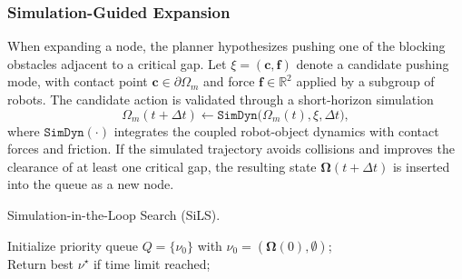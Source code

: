 \subsubsection{Simulation-Guided Expansion}
\label{subsubsec:simloop-expansion}
When expanding a node, the planner hypothesizes pushing one of the blocking
obstacles adjacent to a critical gap. Let $\xi=(\mathbf{c},\mathbf{f})$
denote a candidate pushing mode, with contact point $\mathbf{c}\in\partial\Omega_m$
and force $\mathbf{f}\in\mathbb{R}^2$ applied by a subgroup of robots. The
candidate action is validated through a short-horizon simulation
\begin{equation}\label{eq:simloop-dynamics}
  \Omega_m(t+\Delta t) \leftarrow
  \texttt{SimDyn}\big(\Omega_m(t),\xi,\Delta t\big),
\end{equation}
where $\texttt{SimDyn}(\cdot)$ integrates the coupled robot-object dynamics
with contact forces and friction. If the simulated trajectory avoids
collisions and improves the clearance of at least one critical gap, the
resulting state $\boldsymbol{\Omega}(t+\Delta t)$ is inserted into the queue
as a new node.

\begin{algorithm}[t]
  \caption{Simulation-in-the-Loop Search (SiLS).}
  \label{alg:SiLS}
  \SetAlgoLined
  Initialize priority queue $Q=\{\nu_0\}$ with $\nu_0=(\boldsymbol{\Omega}(0),\emptyset)$;\\
  Return best $\nu^\star$ if time limit reached;
\end{algorithm}

